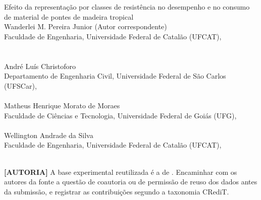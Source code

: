 \begin{center}
{\Huge Efeito da representação por classes de resistência no desempenho e no consumo de material de pontes de madeira tropical}
\\[4ex]

{\large Wanderlei M. Pereira Junior \small(Autor correspondente)} \\
{\small
Faculdade de Engenharia, Universidade Federal de Catalão (UFCAT),  \\
 \\
} \\[1.2em]

{\large André Luís Christoforo} \\
{\small
Departamento de Engenharia Civil, Universidade Federal de São Carlos (UFSCar),  \\
} \\[1.2em]

{\large Matheus Henrique Morato de Moraes} \\
{\small
Faculdade de Ciências e Tecnologia, Universidade Federal de Goiás (UFG),  \\
} \\[1.2em]

{\large Wellington Andrade da Silva} \\
{\small
Faculdade de Engenharia, Universidade Federal de Catalão (UFCAT),  \\
} \\[1.2em]

\begin{fillblock}
\noindent\textbf{[AUTORIA]} A base experimental reutilizada é a de \textcite{DiasLahr2004}. Encaminhar com os autores da fonte a questão de coautoria ou de permissão de reuso dos dados antes da submissão, e registrar as contribuições segundo a taxonomia CRediT.
\end{fillblock}
\end{center}
